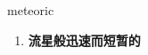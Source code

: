 
\begin{frame}
{\huge meteoric}
\begin{center}
\begin{enumerate}\Large
  \item \textbf{流星般迅速而短暂的}
\end{enumerate}
\end{center}
\end{frame}
